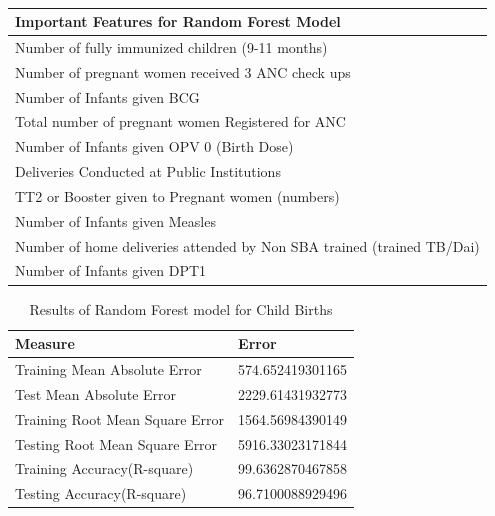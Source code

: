 \documentclass[12pt]{article}
\begin{document}
\begin{table}[!h]
\centering
\caption{}
\vspace{5pt}
\begin{tabular}{|l|}
\hline
\textbf{Important Features for Random Forest Model}          \\ \hline
Number of fully immunized children (9-11 months)                       \\
Number of pregnant women received 3 ANC check ups                      \\
Number of Infants given BCG                                            \\
Total number of pregnant women Registered for ANC                      \\
Number of Infants given OPV 0 (Birth Dose)                             \\
Deliveries Conducted at Public Institutions                            \\
TT2 or Booster given to Pregnant women (numbers)                       \\
Number of Infants given Measles                                        \\
Number of home deliveries attended by Non SBA trained (trained TB/Dai) \\
Number of Infants given DPT1             \\ \hline
\end{tabular}
\end{table}

\pagebreak

\begin{table}[h]
\centering
\caption{Results of Random Forest model for Child Births}
\vspace{5pt}
\begin{tabular}{|l|l|}
\hline
\textbf{Measure}                & \textbf{Error}   \\ \hline
Training Mean Absolute Error    & 574.652419301165 \\
Test Mean Absolute Error        & 2229.61431932773 \\
Training Root Mean Square Error & 1564.56984390149 \\
Testing Root Mean Square Error  & 5916.33023171844 \\
Training Accuracy(R-square)     & 99.6362870467858 \\
Testing Accuracy(R-square)      & 96.7100088929496 \\ \hline
\end{tabular}
\end{table}
\end{document}
